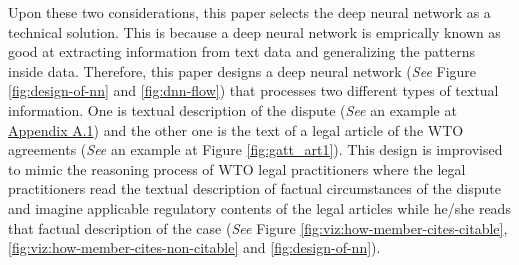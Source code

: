 Upon these two considerations, this paper selects the deep neural network as a technical solution. %
This is because a deep neural network is emprically known as good at extracting information from text data and generalizing the patterns inside data.
Therefore, this paper designs a deep neural network (\textit{See} Figure \ref{fig:design-of-nn} and \ref{fig:dnn-flow}) that
processes two different types of textual information.
One is textual description of the dispute (\textit{See} an example at \hyperref[sub:factual-aspect-example]{Appendix A.1}) and
the other one is the text of a legal article of the WTO agreements (\textit{See} an example at Figure \ref{fig:gatt_art1}).
This design is improvised to mimic
the reasoning process of WTO legal practitioners
where the legal practitioners read
the textual description of
factual circumstances of the dispute and imagine applicable regulatory contents of
the legal articles while he/she reads that factual description of the case (\textit{See} Figure \ref{fig:viz:how-member-cites-citable}, \ref{fig:viz:how-member-cites-non-citable} and \ref{fig:design-of-nn}).
 
 
 
 
 
 

